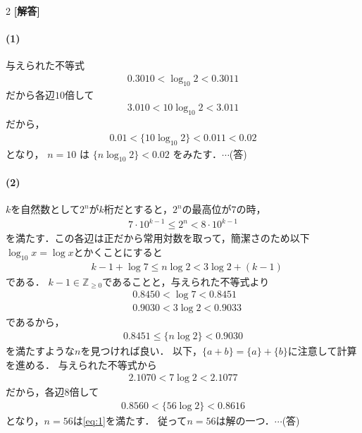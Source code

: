\documentclass[../../main.tex]{subfiles}
\begin{document}
\setcounter{equation}{0}
\begin{oframed}
  
\end{oframed}
\setlength{\columnseprule}{0.4pt}
\begin{multicols}{2}
  {\bf [解答]}
  \paragraph{(1)}
  与えられた不等式
  \begin{align}
    0.3010 < \log_{10} 2 < 0.3011
  \end{align}
  だから各辺$10$倍して
  \begin{align}
    3.010 < 10\log_{10} 2 < 3.011
  \end{align}
  だから，
  \begin{align}
    0.01 < \{10\log_{10} 2\} < 0.011 < 0.02
  \end{align}
  となり， $n=10$ は $\{n\log_{10} 2\} < 0.02$ をみたす．$\cdots$(答)

  \paragraph{(2)}
  $k$を自然数として$2^n$が$k$桁だとすると，$2^n$の最高位が$7$の時，
  \begin{align}
    7 \cdot 10^{k-1} \le 2^n < 8 \cdot 10^{k-1}
  \end{align}
  を満たす．この各辺は正だから常用対数を取って，簡潔さのため以下$\log_{10} x = \log x$とかくことにすると
  \begin{align}
    & k-1 + \log 7 \le n\log 2 < 3\log 2 + (k-1)
  \end{align}
  である．
  $k-1 \in \mathbb{Z}_{\ge 0}$であることと，与えられた不等式より
  \begin{align}
    & 0.8450 < \log 7 < 0.8451  \\
    & 0.9030 < 3\log 2 < 0.9033
  \end{align}
  であるから，
  \begin{align}
    0.8451 \le \{n\log 2\} < 0.9030 \label{eq:1}
  \end{align}
  を満たすような$n$を見つければ良い．
  以下，$\{a+b\}=\{a\}+\{b\}$に注意して計算を進める．
  与えられた不等式から
  \begin{align}
    2.1070 < 7\log 2 < 2.1077
  \end{align}
  だから，各辺$8$倍して
  \begin{align}
    0.8560 < \{56\log 2\} < 0.8616
  \end{align}
  となり，$n=56$は\cref{eq:1}を満たす．
  従って$n=56$は解の一つ．$\cdots$(答)


\end{multicols}
\end{document}
